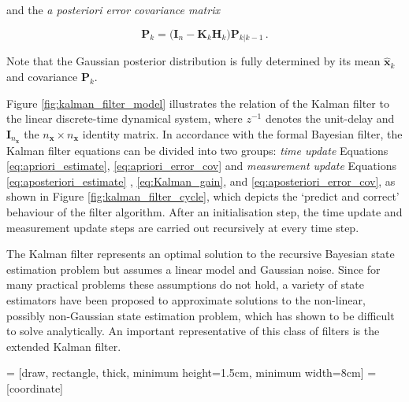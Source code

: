 \noindent
and the \emph{a posteriori error covariance matrix}

\begin{equation}\label{eq:aposteriori_error_cov}
  \bm{P}_{k} = \big(\bm{I}_n - \bm{K}_{k}\bm{H}_{k}\big)\bm{P}_{k|k-1}\,.
\end{equation}

\noindent
Note that the Gaussian posterior distribution is fully determined by its mean $\hat{\bm{x}}_k$ and covariance $\bm{P}_{k}$. 

Figure \ref{fig:kalman_filter_model} illustrates the relation of the Kalman filter to the linear discrete-time dynamical system, where $z^{-1}$ denotes the unit-delay and $\bm{I}_{n_{\bm{x}}}$ the $n_{\bm{x}}\times n_{\bm{x}}$ identity matrix. In accordance with the formal Bayesian filter, the Kalman filter equations can be divided into two groups: \emph{time update} Equations \ref{eq:apriori_estimate}, \ref{eq:apriori_error_cov} and \emph{measurement update} Equations \ref{eq:aposteriori_estimate} , \ref{eq:Kalman_gain}, and \ref{eq:aposteriori_error_cov}, as shown in Figure \ref{fig:kalman_filter_cycle}, which depicts the `predict and correct' behaviour of the filter algorithm. After an initialisation step, the time update and measurement update steps are carried out recursively at every time step.

The Kalman filter represents an optimal solution to the recursive Bayesian state estimation problem but assumes a linear model and Gaussian noise. Since for many practical problems these assumptions do not hold, a variety of state estimators have been proposed to approximate solutions to the non-linear, possibly non-Gaussian state estimation problem, which has shown to be difficult to solve analytically. An important representative of this class of filters is the extended Kalman filter.


 = [draw, rectangle, thick, 
    minimum height=1.5cm, minimum width=8cm]
 = [coordinate]

